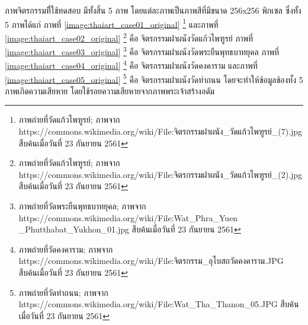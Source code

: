 \hspace{1cm}ภาพจิตรกรรมทีี่ใช้ทดสอบ มีทั้งสิ้น 5  ภาพ โดยแต่ละภาพเป็นภาพสีที่มีขนาด 256x256 พิกเซล ซึ่งทั้ง 5 ภาพได้แก่ ภาพที่ \ref{image:thaiart_case01_original} \footnote{ภาพถ่ายที่วัดแก้วไพฑูรย์; ภาพจาก  https://commons.wikimedia.org/wiki/File:จิตรกรรมฝาผนัง\_วัดแก้วไพฑูรย์\_(7).jpg สืบค้นเมื่อวันที่ 23 กันยายน 2561}   และภาพที่ \ref{image:thaiart_case02_original} \footnote{ภาพถ่ายที่วัดแก้วไพฑูรย์; ภาพจาก  https://commons.wikimedia.org/wiki/File:จิตรกรรมฝาผนัง\_วัดแก้วไพฑูรย์\_(2).jpg สืบค้นเมื่อวันที่ 23 กันยายน 2561} คือ จิตรกรรมฝาผนังวัดแก้วไพฑูรย์ ภาพที่ \ref{image:thaiart_case03_original} \footnote{ภาพถ่ายที่วัดพระยืนพุทธบาทยุคล; ภาพจาก https://commons.wikimedia.org/wiki/File:Wat\_Phra\_Yuen \_Phutthabat\_Yukhon\_01.jpg สืบค้นเมื่อวันที่ 23 กันยายน 2561}  คือ จิตรกรรมฝาผนังวัดพระยืนพุทธบาทยุคล ภาพที่ \ref{image:thaiart_case04_original} \footnote{ภาพถ่ายที่วัดคงคาราม; ภาพจาก  https://commons.wikimedia.org/wiki/File:จิตรกรรม\_อุโบสถวัดคงคาราม.JPG สืบค้นเมื่อวันที่ 23 กันยายน 2561} คือ จิตรกรรมฝาผนังวัดคงคาราม และภาพที่ \ref{image:thaiart_case05_original} \footnote{ภาพถ่ายที่วัดท่าถนน; ภาพจาก  https://commons.wikimedia.org/wiki/File:Wat\_Tha\_Thanon\_05.JPG สืบค้นเมื่อวันที่ 23 กันยายน 2561} คือ จิตรกรรมฝาผนังวัดท่าถนน
    โดยจะทำให้ข้อมูลข้องทั้ง 5 ภาพเกิดความเสียหาย โดยใช้รอยความเสียหายจากภาพพระเจ้าสร้างอดัม
    

